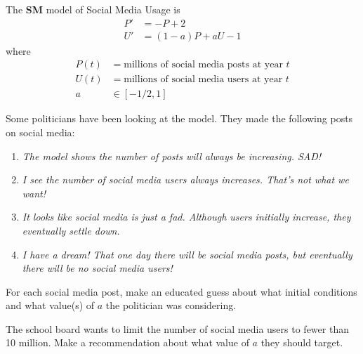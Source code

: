 \documentclass{workbook}
\begin{document}
\begin{slide}
	\question
	The \textbf{SM} model of Social Media Usage is
	\begin{align*}
		P'&=-P+2\\
		U'&=(1-a)P + aU - 1
	\end{align*}
	where
	\begin{align*}
		P(t) &= \text{millions of social media posts at year $t$}\\
		U(t) &= \text{millions of social media users at year $t$}\\
		a &\in [-1/2, 1]
	\end{align*}

	Some politicians have been looking at the model. They made the following posts on social media:
	\begin{enumerate}
			\item \emph{The model shows the number of posts will always be increasing. SAD!}
			\item \emph{I see the number of social media users always increases. That's not what we want!}
			\item \emph{It looks like social media is just a fad. Although users initially increase, they eventually settle down.}
			\item \emph{I have a dream! That one day there will be social media posts, but eventually there will be no social media users!}
	\end{enumerate}
		
	\begin{parts}
		\item For each social media post, make an educated guess about what initial conditions and what
		value(s) of $a$ the politician was considering.
		\item The school board wants to limit the number of social media users to fewer than 10 million.
		Make a recommendation about what value of $a$ they should target.
	\end{parts}
\end{slide}

%
%
\end{document}
